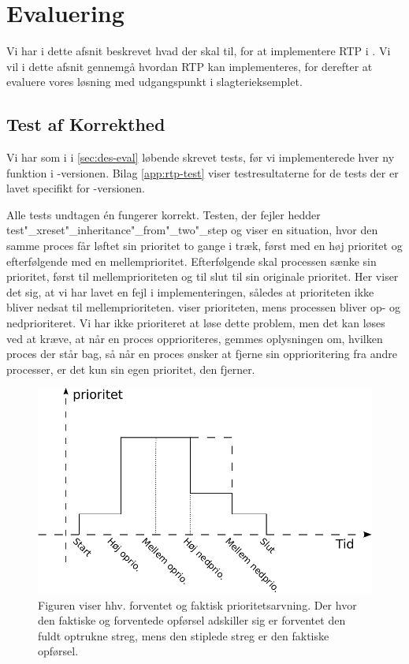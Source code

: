 \section{Evaluering}\label{sec:rtp_evalation}
Vi har i dette afsnit beskrevet hvad der skal til, for at implementere RTP i \pycsp. Vi vil i dette afsnit gennemgå hvordan RTP kan implementeres, for derefter at evaluere vores løsning med udgangspunkt i slagterieksemplet.
\subsection{Test af Korrekthed}
Vi har som i \des i \cref{sec:des-eval} løbende skrevet tests, før vi implementerede hver ny funktion i -versionen.  Bilag \ref{app:rtp-test} viser testresultaterne for de tests der er lavet specifikt for -versionen.

Alle tests undtagen én fungerer korrekt. Testen, der fejler hedder test"_xreset"_inheritance"_from"_two"_step og viser en situation, hvor den samme proces får løftet sin prioritet to gange i træk, først med en høj prioritet og efterfølgende med en mellemprioritet. Efterfølgende skal processen sænke sin prioritet, først til  mellemprioriteten og til slut til sin originale prioritet. Her viser det sig, at vi har lavet en fejl i implementeringen, således at prioriteten ikke bliver nedsat til mellemprioriteten.  viser prioriteten, mens processen bliver op- og nedprioriteret. Vi har ikke prioriteret at løse dette problem, men det kan løses ved at kræve, at når en proces opprioriteres, gemmes oplysningen om, hvilken proces der står bag, så når en proces ønsker at fjerne sin opprioritering fra andre processer, er det kun sin egen  prioritet, den fjerner.  
 
  
\begin{figure}
 \begin{center}
  \includegraphics[scale=1]{images/priority-inheritance}
	\caption{Figuren viser hhv. forventet og faktisk prioritetsarvning. Der hvor den faktiske og forventede opførsel adskiller sig er forventet den fuldt optrukne streg, mens den stiplede streg er den faktiske opførsel.}
	\label{fig:priority-inheritance}
\end{center}
\end{figure}
  

